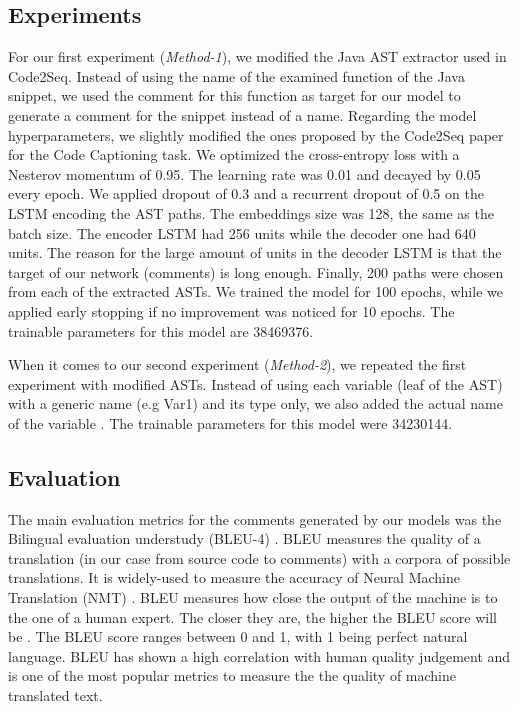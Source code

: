 \documentclass[a4paper,10pt]{article}
\theoremstyle{plain}
\theoremstyle{definition}
\begin{document}
\begin{multicols*}{2}
\subsection{Experiments}

For our first experiment (\textit{Method-1}), we modified the Java AST extractor used in Code2Seq. Instead of using the name of the examined function of the Java snippet, we used the comment for this function as target for our model to generate a comment for the snippet instead of a name. Regarding the model hyperparameters, we slightly modified the ones proposed by the Code2Seq paper for the Code Captioning task. We optimized the cross-entropy loss with a Nesterov momentum of 0.95. The learning rate was 0.01 and decayed by 0.05 every epoch. We applied dropout of 0.3 and a recurrent dropout of 0.5 on the LSTM encoding the AST paths. The embeddings size was 128, the same as the batch size. The encoder LSTM had 256 units while the decoder one had 640 units. The reason for the large amount of units in the decoder LSTM is that the target of our network (comments) is long enough. Finally, 200 paths were chosen from each of the extracted ASTs. We trained the model for 100 epochs, while we applied early stopping if no improvement was noticed for 10 epochs. The  trainable parameters for this model are 38469376.

When it comes to our second experiment (\textit{Method-2}), we repeated the first experiment with modified ASTs. Instead of using each variable (leaf of the AST) with a generic name (e.g Var1) and its type only, we also added the actual name of the variable \cite{ZHOU2019328}. The  trainable parameters for this model were 34230144.

\subsection{Evaluation}
The main evaluation metrics for the comments generated by our models was the Bilingual evaluation understudy (BLEU-4) \cite{Papineni:2002:BMA:1073083.1073135}. BLEU measures the quality of  a translation (in our case from source code to comments) with a corpora of possible translations. It is widely-used to measure the accuracy of Neural Machine Translation (NMT) \cite{klein2017opennmt}. BLEU measures how close the output of the machine is to the one of a human expert. The closer they are, the higher the BLEU score will be \cite{ward2002corpus}. The BLEU score ranges between 0 and 1, with 1 being perfect natural language. BLEU has shown a high correlation with human quality judgement \cite{callison2006re} and is one of the most popular metrics to measure the the quality of machine translated text.


\end{multicols*}
\end{document}
